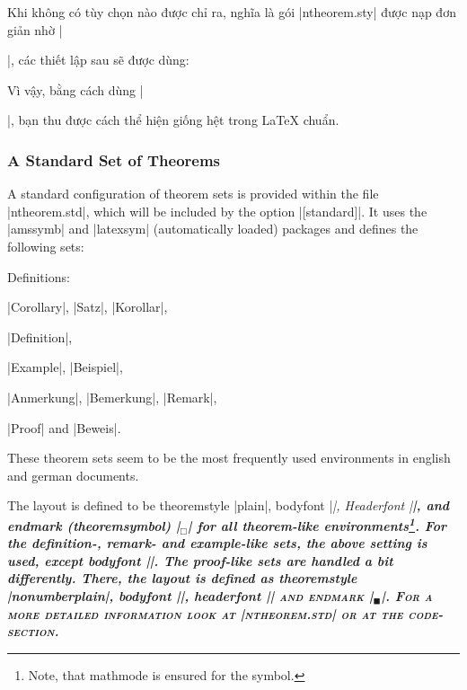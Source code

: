 Khi không có tùy chọn nào được chỉ ra, nghĩa là gói |ntheorem.sty|
được nạp đơn giản nhờ |\usepackage{ntheorem}|, các thiết lập sau
sẽ được dùng:
\begin{example} 
  \theoremstyle{plain}
  \theoremheaderfont{\normalfont\bfseries}
  \theorembodyfont{\itshape}
  \theoremseparator{}
  \theoremsymbol{}
\end{example}
Vì vậy, bằng cách dùng |\newtheorem{...}{...}|, bạn thu được
cách thể hiện giống hệt trong \LaTeX{} chuẩn.

\subsubsection{A Standard Set of Theorems}\label{sec:standard}

A standard configuration of theorem sets is provided within
the file |ntheorem.std|, which will be included by the option
|[standard]|. It uses the |amssymb| and |latexsym| (automatically
loaded) packages and defines the following sets:
\begin{nlist}{Definitions:}
 \item[Theorems:] %
  |Corollary|, |Satz|, |Korollar|,
 \item[Definitions:] |Definition|,
 \item[Examples:] |Example|, |Beispiel|,
 \item[Remarks:] |Anmerkung|, |Bemerkung|, |Remark|,
 \item[Proofs:] |Proof| and |Beweis|.
\end{nlist}
These theorem sets seem to be the most frequently used environments 
in english and german
documents.

The layout is defined to be theoremstyle |plain|, bodyfont |\itshape|,
Headerfont |\bfseries|, and endmark (theoremsymbol)
|\ensuremath{_\Box}| for all theorem-like environments\footnote{Note, 
that mathmode is ensured for the symbol.}.
For the definition-, remark- and example-like sets,
the above setting is used, except bodyfont |\upshape|.
The proof-like sets are handled a bit differently. There, the layout 
is defined as theoremstyle |nonumberplain|, bodyfont |\upshape|,
headerfont |\scshape| and endmark |\ensuremath{_\blacksquare}|. 
For a more detailed information look at 
|ntheorem.std| or at the code-section.

